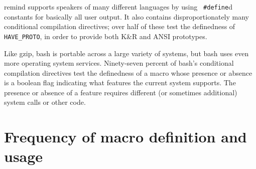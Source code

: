 \documentclass[11pt]{article}
\begin{document}
remind supports speakers of many different languages by using {\tt
\#define}d constants for basically all user output.  It also contains
disproportionately many conditional compilation directives; over half of
these test the definedness of \verb|HAVE_PROTO|, in order to provide both
K\&R and ANSI prototypes.

Like gzip, bash is portable across a large variety of systems, but bash
uses even more operating system services.  Ninety-seven percent of bash's
conditional compilation directives test the definedness of a macro whose
presence or absence is a boolean flag indicating what features the current
system supports.  The presence or absence of a feature requires different
(or sometimes additional) system calls or other code.


\section{Frequency of macro definition and usage}
\label{sec:usage}


%
%


\end{document}
